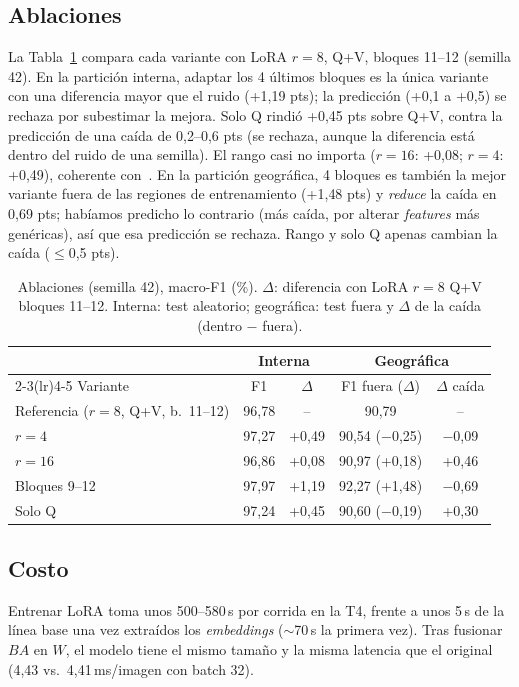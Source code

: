 \documentclass[conference,a4paper]{IEEEtran}
\begin{document}
\subsection{Ablaciones}
La Tabla~\ref{tab:ablaciones} compara cada variante con LoRA $r{=}8$, Q+V, bloques 11--12 (semilla 42). En la partición interna, adaptar los 4 últimos bloques es la única variante con una diferencia mayor que el ruido (+1{,}19 pts); la predicción (+0{,}1 a +0{,}5) se rechaza por subestimar la mejora. Solo Q rindió +0{,}45 pts sobre Q+V, contra la predicción de una caída de 0{,}2--0{,}6 pts (se rechaza, aunque la diferencia está dentro del ruido de una semilla). El rango casi no importa ($r{=}16$: +0{,}08; $r{=}4$: +0{,}49), coherente con~\cite{hu2022}. En la partición geográfica, 4 bloques es también la mejor variante fuera de las regiones de entrenamiento (+1{,}48 pts) y \emph{reduce} la caída en 0{,}69 pts; habíamos predicho lo contrario (más caída, por alterar \emph{features} más genéricas), así que esa predicción se rechaza. Rango y solo Q apenas cambian la caída ($\le$0{,}5 pts).

\begin{table}[t]
\centering
\caption{Ablaciones (semilla 42), macro-F1 (\%). $\Delta$: diferencia con LoRA $r{=}8$ Q+V bloques 11--12. Interna: test aleatorio; geográfica: test fuera y $\Delta$ de la caída (dentro $-$ fuera).}
\label{tab:ablaciones}
\setlength{\tabcolsep}{4pt}
\begin{tabular}{@{}lcccc@{}}
\toprule
& \multicolumn{2}{c}{Interna} & \multicolumn{2}{c}{Geográfica} \\
\cmidrule(lr){2-3}\cmidrule(lr){4-5}
Variante & F1 & $\Delta$ & F1 fuera ($\Delta$) & $\Delta$ caída \\
\midrule
Referencia ($r{=}8$, Q+V, b.\ 11--12) & 96{,}78 & -- & 90{,}79 & -- \\
$r=4$ & 97{,}27 & +0{,}49 & 90{,}54 ($-$0{,}25) & $-$0{,}09 \\
$r=16$ & 96{,}86 & +0{,}08 & 90{,}97 (+0{,}18) & +0{,}46 \\
Bloques 9--12 & 97{,}97 & +1{,}19 & 92{,}27 (+1{,}48) & $-$0{,}69 \\
Solo Q & 97{,}24 & +0{,}45 & 90{,}60 ($-$0{,}19) & +0{,}30 \\
\bottomrule
\end{tabular}
\end{table}

\subsection{Costo}
Entrenar LoRA toma unos 500--580\,s por corrida en la T4, frente a unos 5\,s de la línea base una vez extraídos los \emph{embeddings} ($\sim$70\,s la primera vez). Tras fusionar $BA$ en $W$, el modelo tiene el mismo tamaño y la misma latencia que el original (4{,}43 vs.\ 4{,}41\,ms/imagen con batch 32).
\end{document}
